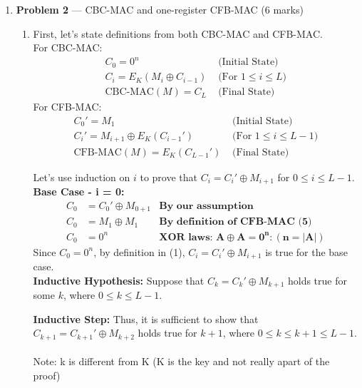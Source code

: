\documentclass[11pt]{article}
\theoremstyle{definition}
\begin{document}
\begin{enumerate}
\newpage

\item[] \textbf{Problem 2} --- CBC-MAC and one-register CFB-MAC (6 marks)

\begin{enumerate}

\item First, let's state definitions from both CBC-MAC and CFB-MAC.\\
For CBC-MAC:
\begin{align}
C_0 = 0^n &\text{ (Initial State)}\\
C_i = E_K(M_i \oplus C_{i-1}) &\text{ (For } 1 \le i \le L \text{)}\\
\text{CBC-MAC}(M) = C_L &\text{ (Final State)}
\end{align}
For CFB-MAC:
\begin{align}
C_0'= M_1 &\text{ (Initial State)}\\
C_i'= M_{i+1} \oplus E_K(C_{i-1}') &\text{ (For } 1 \le i \le L - 1 \text{)}\\
\text{CFB-MAC}(M) = E_K(C_{L-1}') &\text{ (Final State) }
\end{align}

Let's use induction on $i$ to prove that $C_i = C_i' \oplus M_{i+1}$ for $0 \le i \le L - 1$.\\

\textbf{Base Case - i = 0:}
\begin{align*}
C_0 &= C_0' \oplus M_{0+1}  &\textbf{By our assumption}\\
C_0 &= M_1 \oplus M_1  &\textbf{By definition of CFB-MAC (5)}\\
C_0 &= 0^n &\textbf{XOR laws: } \mathbf{A \oplus A = 0^n : (n = |A|)}
\end{align*}
Since $C_0 = 0^n$, by definition in (1), $C_i = C_i' \oplus M_{i+1}$  is true for the base case.\\

\textbf{Inductive Hypothesis: }Suppose that $C_k = C_k' \oplus M_{k+1}$ holds true for some $k$, where $0 \le k \le L - 1$.

\textbf{Inductive Step: }Thus, it is sufficient to show that $C_{k+1} = C_{k+1}' \oplus M_{k+2}$ holds true for $k+1$, where $0 \le k \le k + 1 \le L - 1$.\\\\
Note: k is different from K (K is the key and not really apart of the proof)\\


\end{enumerate}
\end{enumerate}
\end{document}
